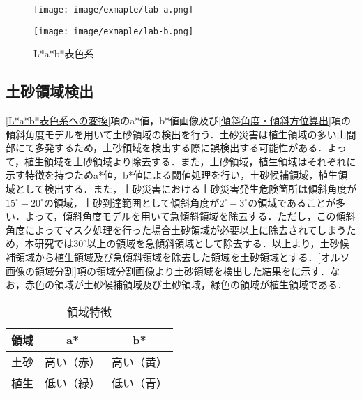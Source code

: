       \begin{figure}[tbp]
        \begin{minipage}[c]{0.5\hsize}
          \centering
          \texttt{[image: image/exmaple/lab-a.png]}
        \end{minipage}
        \begin{minipage}[c]{0.5\hsize}
          \centering
          \texttt{[image: image/exmaple/lab-b.png]}
        \end{minipage}
        \caption{L*a*b*表色系}
        \label{Lab画像}
      \end{figure}


    \subsection{土砂領域検出}
      \label{土砂領域検出}
      \ref{L*a*b*表色系への変換}項のa*値，b*値画像及び\ref{傾斜角度・傾斜方位算出}項の傾斜角度モデルを用いて土砂領域の検出を行う．土砂災害は植生領域の多い山間部にて多発するため，土砂領域を検出する際に誤検出する可能性がある．よって，植生領域を土砂領域より除去する．また，土砂領域，植生領域はそれぞれに示す特徴を持つためa*値，b*値による閾値処理を行い，土砂候補領域，植生領域として検出する．また，土砂災害における土砂災害発生危険箇所は傾斜角度が$15^{\circ} - 20^{\circ}$の領域，土砂到達範囲として傾斜角度が$2^{\circ} - 3^{\circ}$の領域であることが多い\cite{土砂災害発生範囲}．よって，傾斜角度モデルを用いて急傾斜領域を除去する．ただし，この傾斜角度によってマスク処理を行った場合土砂領域が必要以上に除去されてしまうため，本研究では$30^{\circ}$以上の領域を急傾斜領域として除去する．以上より，土砂候補領域から植生領域及び急傾斜領域を除去した領域を土砂領域とする．\ref{オルソ画像の領域分割}項の領域分割画像より土砂領域を検出した結果をに示す．なお，赤色の領域が土砂候補領域及び土砂領域，緑色の領域が植生領域である．

      \begin{table}[tbp]
        \centering
        \caption{領域特徴}
        \label{領域特徴}
        \begin{tabular}{ccc}
          \hline
          \textbf{領域} & \textbf{a*} & \textbf{b*} \\
          \hline  \hline
          土砂 & 高い（赤） & 高い（黄） \\
          植生 & 低い（緑） & 低い（青） \\ \hline
        \end{tabular}
      \end{table}
      
